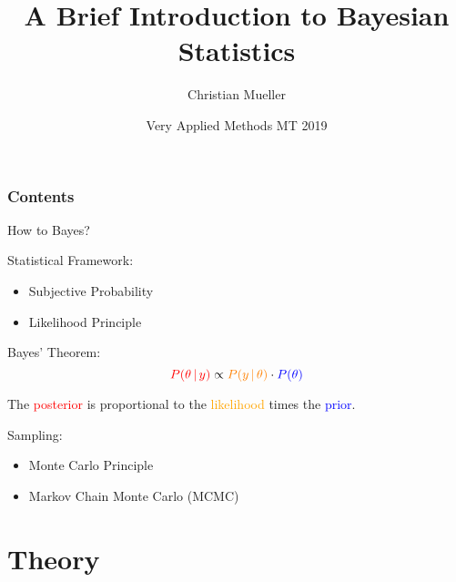 \documentclass[10pt,handout]{beamer}
\title{A Brief Introduction to Bayesian Statistics}
\author{Christian Mueller}
\date{Very Applied Methods MT 2019}
\begin{document}
\begin{frame}
  \titlepage
\end{frame}

\begin{frame}
  \frametitle{Contents}
  \tableofcontents
\end{frame}

\begin{frame}[c]{How to Bayes?}

  \begin{block}{Statistical Framework:}
    \begin{itemize}
      \item Subjective Probability
      \item Likelihood Principle
    \end{itemize}
  \end{block}

  \begin{block}{Bayes' Theorem:}
  \[
    {\color{red}P(\theta\, |\, y)} \propto {\color{orange}P(y\, |\, \theta)} \cdot {\color{blue}P(\theta )}
  \]

  The \textcolor{red}{posterior} is proportional to the \textcolor{orange}{likelihood} times the \textcolor{blue}{prior}.
  \end{block}

  \begin{block}{Sampling:}
    \begin{itemize}
      \item Monte Carlo Principle
      \item Markov Chain Monte Carlo (MCMC)
    \end{itemize}
  \end{block}

\end{frame}

\section{Theory}%
\label{sec:from_maximum_likelihood_to_bayesian}
\end{document}
